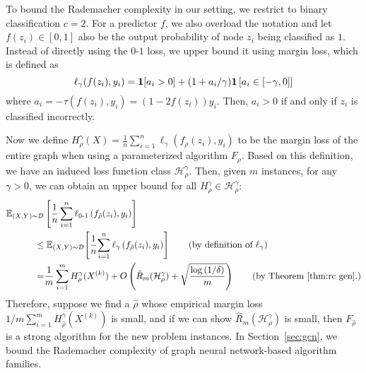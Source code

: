 \noindent To bound the Rademacher complexity in our setting, we restrict to binary classification $c=2$. %
For a predictor $f$, we also overload the notation and let $f(z_i) \in [0,1]$ also be the output probability of node $z_i$ being classified as $1$. Instead of directly using the $0$-$1$ loss, we upper bound it using margin loss, which is defined as
\[\ell_\gamma(f(z_i),y_i) = \mathbf{1}[a_i > 0] + (1 + a_i/\gamma)\mathbf{1}\left[a_i \in \left[-\gamma, 0\right]\right]\]
where  $a_i = -\tau(f(z_i), y_i)= (1-2f(z_i))y_i$. 
Then, $a_i>0$ if and only if $z_i$ is classified incorrectly.

Now we define $H^{\gamma}_{\rho}(X) = \frac{1}{n}\sum_{i=1}^n \ell_\gamma\left(f_{\rho}(z_i),y_i\right)$ to be the margin loss of the entire graph when using a parameterized algorithm $F_\rho$.
Based on this definition, we have an induced loss function class $\mathcal{H}^{\gamma}_\rho$.
Then, given $m$ instances, for any $\gamma > 0$, we can obtain an upper bound for all $H_\rho^\gamma \in \mathcal{H}_\rho^\gamma$:
\begin{align*}
\mathbb{E}_{\left(X,Y\right) \sim \mathcal{D}}&\left[\frac{1}{n}\sum_{i=1}^n \ell_{0\text{-}1}\left(f_{\hat{\rho}}(z_i), y_i\right)\right] \\
\le & \; \mathbb{E}_{\left(X,Y\right) \sim \mathcal{D}}\!\left[\frac{1}{n}\!\sum_{i=1}^n \ell_{\gamma}\left(f_{\hat{\rho}}(z_i),y_i\right)\right] \tag{by definition of $\ell_\gamma$} \\
= &\frac{1}{m} \sum_{i=1}^m H^{\gamma}_{\rho}(X^{(k)}) + O\left(\hat R_m(\mathcal{H}_\rho^\gamma) + \sqrt{\frac{\log{(1/\delta)}}{m}}\right) \tag{by Theorem~\ref{thm:rc gen}.}
\end{align*}
Therefore, suppose we find a $\hat{\rho}$ whose empirical margin loss ${1}/{m} \sum_{i=1}^m H^{\gamma}_{\hat{\rho}}(X^{(k)})$ is small, and if we can show $\hat R_m(\mathcal{H}_\rho^\gamma)$ is small, then $F_{\hat{\rho}}$ is a strong algorithm for the new problem instances.
In Section~\ref{sec:gcn}, we bound the Rademacher complexity of graph neural network-based algorithm families.